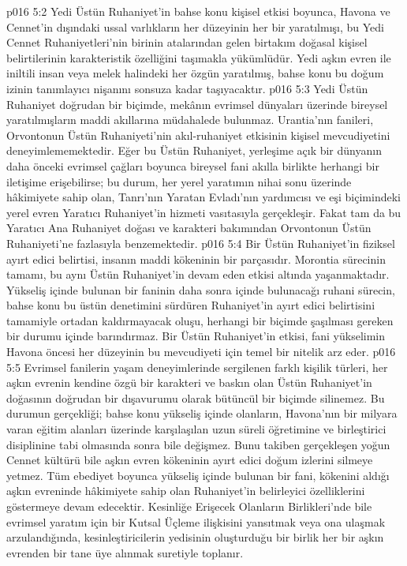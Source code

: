\vs p016 5:2 Yedi Üstün Ruhaniyet’in bahse konu kişisel etkisi boyunca, Havona ve Cennet’in dışındaki ussal varlıkların her düzeyinin her bir yaratılmışı, bu Yedi Cennet Ruhaniyetleri’nin birinin atalarından gelen birtakım doğasal kişisel belirtilerinin karakteristik özelliğini taşımakla yükümlüdür. Yedi aşkın evren ile iniltili insan veya melek halindeki her özgün yaratılmış, bahse konu bu doğum izinin tanımlayıcı nişanını sonsuza kadar taşıyacaktır.
\vs p016 5:3 Yedi Üstün Ruhaniyet doğrudan bir biçimde, mekânın evrimsel dünyaları üzerinde bireysel yaratılmışların maddi akıllarına müdahalede bulunmaz. Urantia’nın fanileri, Orvontonun Üstün Ruhaniyeti’nin akıl\hyp{}ruhaniyet etkisinin kişisel mevcudiyetini deneyimlememektedir. Eğer bu Üstün Ruhaniyet, yerleşime açık bir dünyanın daha önceki evrimsel çağları boyunca bireysel fani akılla birlikte herhangi bir iletişime erişebilirse; bu durum, her yerel yaratımın nihai sonu üzerinde hâkimiyete sahip olan, Tanrı’nın Yaratan Evladı’nın yardımcısı ve eşi biçimindeki yerel evren Yaratıcı Ruhaniyet’in hizmeti vasıtasıyla gerçekleşir. Fakat tam da bu Yaratıcı Ana Ruhaniyet doğası ve karakteri bakımından Orvontonun Üstün Ruhaniyeti’ne fazlasıyla benzemektedir.
\vs p016 5:4 Bir Üstün Ruhaniyet’in fiziksel ayırt edici belirtisi, insanın maddi kökeninin bir parçasıdır. Morontia sürecinin tamamı, bu aynı Üstün Ruhaniyet’in devam eden etkisi altında yaşanmaktadır. Yükseliş içinde bulunan bir faninin daha sonra içinde bulunacağı ruhani sürecin, bahse konu bu üstün denetimini sürdüren Ruhaniyet’in ayırt edici belirtisini tamamiyle ortadan kaldırmayacak oluşu, herhangi bir biçimde şaşılması gereken bir durumu içinde barındırmaz. Bir Üstün Ruhaniyet’in etkisi, fani yükselimin Havona öncesi her düzeyinin bu mevcudiyeti için temel bir nitelik arz eder.
\vs p016 5:5 Evrimsel fanilerin yaşam deneyimlerinde sergilenen farklı kişilik türleri, her aşkın evrenin kendine özgü bir karakteri ve baskın olan Üstün Ruhaniyet’in doğasının doğrudan bir dışavurumu olarak bütüncül bir biçimde silinemez. Bu durumun gerçekliği; bahse konu yükseliş içinde olanların, Havona’nın bir milyara varan eğitim alanları üzerinde karşılaşılan uzun süreli öğretimine ve birleştirici disiplinine tabi olmasında sonra bile değişmez. Bunu takiben gerçekleşen yoğun Cennet kültürü bile aşkın evren kökeninin ayırt edici doğum izlerini silmeye yetmez. Tüm ebediyet boyunca yükseliş içinde bulunan bir fani, kökenini aldığı aşkın evreninde hâkimiyete sahip olan Ruhaniyet’in belirleyici özelliklerini göstermeye devam edecektir. Kesinliğe Erişecek Olanların Birlikleri’nde bile evrimsel yaratım için  bir Kutsal Üçleme ilişkisini yansıtmak veya ona ulaşmak arzulandığında, kesinleştiricilerin yedisinin oluşturduğu bir birlik her bir aşkın evrenden bir tane üye alınmak suretiyle toplanır.
